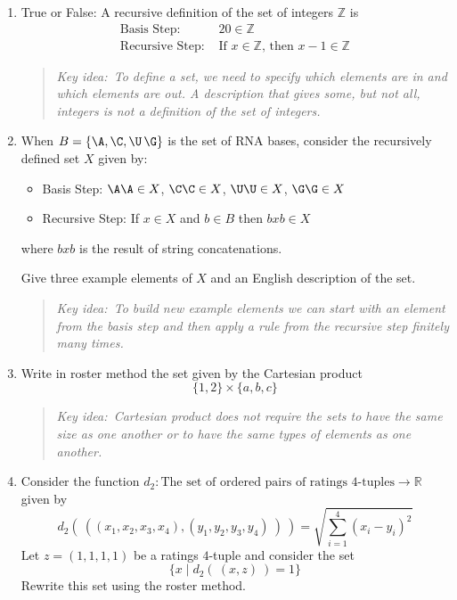 
\newcommand{\KeyIdea}[1]{\begin{quote}{\it Key idea:~{#1}}\end{quote}}

\begin{enumerate}
    \item True or False: A recursive definition of the set of integers $\mathbb{Z}$ is 
    \[
        \begin{array}{ll}
        \textrm{Basis Step: } & 20 \in \mathbb{Z} \\
        \textrm{Recursive Step: } & \textrm{If } x \in \mathbb{Z} \textrm{, then } x-1 \in \mathbb{Z}
        \end{array}
    \]

        \KeyIdea{To define a set, we need to specify which elements are in and which elements are out.
        A description that gives some, but not all, integers is not a definition of the set of integers.}

    \item When $B = \{ \A, \C, \U\, \G\}$ is the set of RNA bases, 
    consider the recursively defined set $X$ given by:
    \begin{itemize}
    \item[] Basis Step: $\A\A \in X$, $\C\C \in X$, $\U\U \in X$, $\G\G \in X$
    \item[] Recursive Step: If $x \in X$ and $b \in B$ then $bxb \in X$
    \end{itemize}
    where $bxb$ is the result of string concatenations.

    Give three example elements of $X$ and an English description of the set.

        \KeyIdea{To build new example elements we can start with an element from 
        the basis step and then apply a rule from the recursive step finitely many times.}

    \item Write in roster method the set given by the Cartesian product
    \[ 
        \{1,2\} \times \{a,b,c\}
    \]

        \KeyIdea{Cartesian product does not require the sets to have the same size as one another
        or to have the same types of elements as one another.}

    \item Consider the function $d_2: \textrm{The set of ordered pairs of ratings $4$-tuples} \to \mathbb{R}$
    given by 
    \[ 
        d_2 (~( (x_1, x_2, x_3, x_4), (y_1, y_2, y_3, y_4)~)~) = \sqrt{\sum_{i=1}^4 (x_i - y_i)^2}
    \]
    Let $z = (1,1,1,1)$ be a ratings $4$-tuple and consider the set
    \[
        \{ x \mid d_2 ( ~(x,z)~) = 1 \}
    \]
    Rewrite this set using the roster method.


\end{enumerate}
